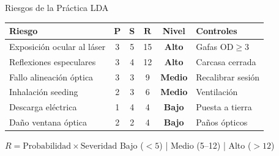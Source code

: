 \documentclass[aspectratio=169,12pt]{beamer}
\begin{document}
\begin{frame}{Riesgos de la Práctica LDA}
	\centering\small
	\begin{tabular}{>{\raggedright\arraybackslash}p{2.6cm}
		c c c c l}
		\toprule
		\textbf{Riesgo} & \textbf{P}                             & \textbf{S}
		                & $\boldsymbol{R}$                       & \textbf{Nivel}
		                & \textbf{Controles}                                           \\
		\midrule
		\rowcolor{aerored!15}
		Exposición ocular al láser
		                & 3                                      & 5              & 15
		                & \textcolor{aerored}{\textbf{Alto}}
		                & Gafas OD${\geq}3$                                            \\
		\rowcolor{aerored!15}
		Reflexiones especulares
		                & 3                                      & 4              & 12
		                & \textcolor{aerored}{\textbf{Alto}}
		                & Carcasa cerrada                                              \\
		\rowcolor{aeroyellow!15}
		Fallo alineación óptica
		                & 3                                      & 3              & 9
		                & \textcolor{aeroyellow}{\textbf{Medio}}
		                & Recalibrar sesión                                            \\
		\rowcolor{aeroyellow!15}
		Inhalación seeding
		                & 2                                      & 3              & 6
		                & \textcolor{aeroyellow}{\textbf{Medio}}
		                & Ventilación                                                  \\
		\rowcolor{aerogreen!15}
		Descarga eléctrica
		                & 1                                      & 4              & 4
		                & \textcolor{aerogreen}{\textbf{Bajo}}
		                & Puesta a tierra                                              \\
		\rowcolor{aerogreen!15}
		Daño ventana óptica
		                & 2                                      & 2              & 4
		                & \textcolor{aerogreen}{\textbf{Bajo}}
		                & Paños ópticos                                                \\
		\bottomrule
	\end{tabular}

	\vspace{0.3em}
	\begin{block}{$R = \text{Probabilidad} \times \text{Severidad}$}
		Bajo ($<5$) \quad | \quad Medio (5--12)
		\quad | \quad Alto ($>12$)
	\end{block}
\end{frame}
\end{document}
